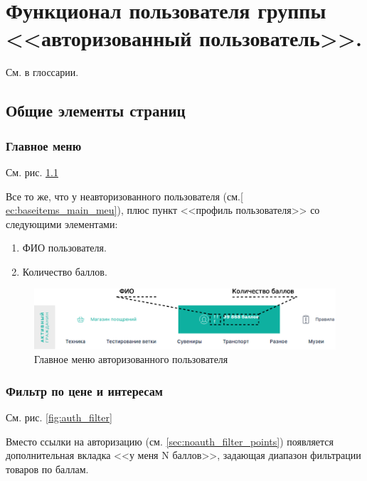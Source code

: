 \chapter{Функционал пользователя группы <<авторизованный пользователь>>.}

    См.  в глоссарии.

    \section{Общие элементы страниц}
        \subsection{Главное меню}
            
            См. рис. \ref{fig:auth_main_menu}

            Все то же, что у неавторизованного пользователя (см.\ref{
                ec:baseitems_main_meu}), плюс пункт <<профиль пользователя>> со
                следующими элементами: 
            \begin{enumerate}
                \item ФИО пользователя.
                \item Количество баллов.
            \end{enumerate}


        \begin{figure}
            \center
            \includegraphics[width=170mm]{04_auth_funcs/figures/01.eps}
            \caption{Главное меню авторизованного пользователя}
            \label{fig:auth_main_menu}
        \end{figure}
        
        \subsection{Фильтр по цене и интересам}

            См. рис. \ref{fig:auth_filter}

            Вместо ссылки на авторизацию (см. 
            \ref{sec:noauth_filter_points}) появляется дополнительная вкладка
            <<у меня N баллов>>, задающая диапазон фильтрации товаров по 
            баллам.
            
